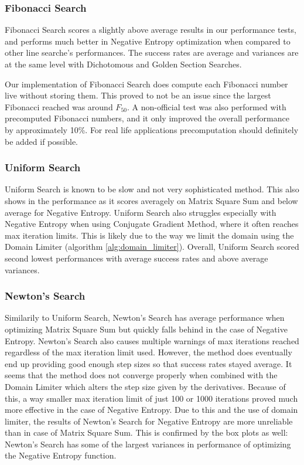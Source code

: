 \documentclass[a4paper,english,titlepage,12pt]{article}
\begin{document}
\subsubsection*{Fibonacci Search}

Fibonacci Search scores a slightly above average results in our performance tests, and performs much better in Negative Entropy optimization when compared to other line searche's performances. The success rates are average and variances are at the same level with Dichotomous and Golden Section Searches.

Our implementation of Fibonacci Search does compute each Fibonacci number live without storing them. This proved to not be an issue since the largest Fibonacci reached was around $F_{50}$. A non-official test was also performed with precomputed Fibonacci numbers, and it only improved the overall performance by approximately 10\%. For real life applications precomputation should definitely be added if possible.

\subsubsection*{Uniform Search}

Uniform Search is known to be slow and not very sophisticated method. This also shows in the performance as it scores averagely on Matrix Square Sum and below average for Negative Entropy. Uniform Search also struggles especially with Negative Entropy when using Conjugate Gradient Method, where it often reaches max iteration limits. This is likely due to the way we limit the domain using the Domain Limiter (algorithm \ref{alg:domain_limiter}). Overall, Uniform Search scored second lowest performances with average success rates and above average variances.

\subsubsection*{Newton's Search}

Similarily to Uniform Search, Newton's Search has average performance when optimizing Matrix Square Sum but quickly falls behind in the case of Negative Entropy. Newton's Search also causes multiple warnings of max iterations reached regardless of the max iteration limit used. However, the method does eventually end up providing good enough step sizes so that success rates stayed average. It seems that the method does not converge properly when combined with the Domain Limiter which alters the step size given by the derivatives. Because of this, a way smaller max iteration limit of just 100 or 1000 iterations proved much more effective in the case of Negative Entropy. Due to this and the use of domain limiter, the results of Newton's Search for Negative Entropy are more unreliable than in case of Matrix Square Sum. This is confirmed by the box plots as well: Newton's Search has some of the largest variances in performance of optimizing the Negative Entropy function.
\end{document}
